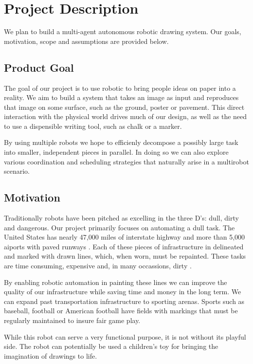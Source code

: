 
\section{Project Description}
\label{sec:project_description}
We plan to build a multi-agent autonomous robotic drawing system. Our goals, motivation, scope and assumptions are provided below.

\subsection{Product Goal}
\label{sec:project_goal}
The goal of our project is to use robotic to bring people ideas on paper into a reality. 
We aim to build a system that takes an image as input and reproduces that image on some surface, such as the ground, poster or pavement.
This direct interaction with the physical world drives much of our design, as well as the need to use a dispensible writing tool, such as chalk or a marker. 

By using multiple robots we hope to efficienly decompose a possibly large task into smaller, independent pieces in parallel.
In doing so we can also explore various coordination and scheduling strategies that naturally arise in a multirobot scenario. 

\subsection{Motivation}
\label{sec:motivation}

Traditionally robots have been pitched as excelling in the three D's: dull, dirty and dangerous. Our project primarily focuses on automating a dull task. The United States has nearly 47,000 miles of interstate highway and more than 5,000 aiports with paved runways . Each of these pieces of infrastructure in delineated and marked with drawn lines, which, when worn, must be repainted. These tasks are time consuming, expensive and, in many occassions, dirty .  

By enabling robotic automation in painting these lines we can improve the quality of our infrastructure while saving time and money in the long term. We can expand past transportation infrastructure to sporting arenas. Sports such as baseball, football or American football have fields with markings that must be regularly maintained to insure fair game play. 

While this robot can serve a very functional purpose, it is not without its playful side. The robot can potentially be used a children's toy for bringing the imagination of drawings to life. 


